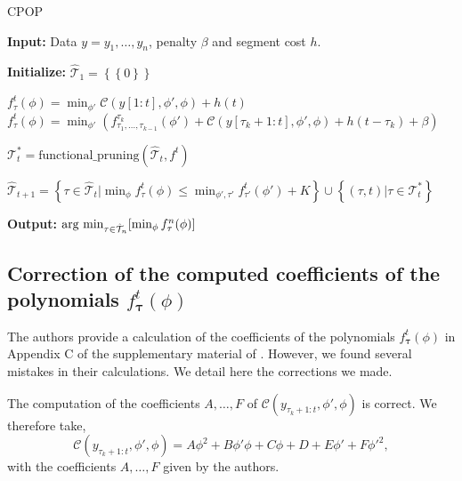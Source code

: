 \documentclass[11pt]{article}
\begin{document}
\begin{algorithm}[H]
    \caption{CPOP}
    \begin{algorithmic}[1]
        \State \textbf{Input:} Data $y=y_1,\dots,y_n$, penalty $\beta$ and segment cost $h$.

        \State \textbf{Initialize:} $\hat{\mathcal{T}}_1=\left\{\left\{0\right\}\right\}$

         
        \If {$\tau = \left\{0\right\}$}
        \State $f^t_{\tau}(\phi)=\min_{\phi'}\mathcal{C}(y[1:t],\phi',\phi)+h(t)$
        \Else {}
        \State $f^t_{\tau}(\phi)=\min_{\phi'}\left(f^{\tau_k}_{\tau_1,\dots,\tau_{k-1}}(\phi')+\mathcal{C}(y[\tau_k+1:t],\phi',\phi)+h(t-\tau_k)+\beta\right)$
        \EndIf
        \EndFor

        \State $\mathcal{T}^*_t = \text{functional\_pruning}(\hat{\mathcal{T}}_t, f^t)$

        \State $\hat{\mathcal{T}}_{t+1}= \left\{\tau\in \hat{\mathcal{T}}_t \big| \min_\phi f_\tau^t(\phi)\leq \min_{\phi',\tau'}f_{\tau'}^t(\phi')+K\right\}\cup \left\{(\tau, t)\big|\tau\in \mathcal{T}^*_t\right\}$
        \EndFor

        \State \textbf{Output:} $\operatorname*{\mbox{arg min}}_{\tau\in \hat{\mathcal{T}}_n}[\min_\phi f^n_\tau(\phi)]$
    \end{algorithmic}
\end{algorithm}
\clearpage
\subsection{Correction of the computed coefficients of the polynomials $f^t_{\boldsymbol{\tau}}(\phi)$}
\label{appendix:coefficients}
The authors provide a calculation of the coefficients of the polynomials $f^t_{\boldsymbol{\tau}}(\phi)$ in Appendix C of the supplementary material of \cite{main_article}. However, we found several mistakes in their calculations. We detail here the corrections we made.

The computation of the coefficients $A,\dots,F$ of $\mathcal{C}(y_{\tau_k+1:t},\phi',\phi)$ is correct. We therefore take,
\begin{equation}
    \mathcal{C}(y_{\tau_k+1:t},\phi',\phi) = A\phi^2+B\phi'\phi + C\phi + D + E\phi'+F{\phi'}^2,
\end{equation}
with the coefficients $A,\dots,F$ given by the authors.
\end{document}

